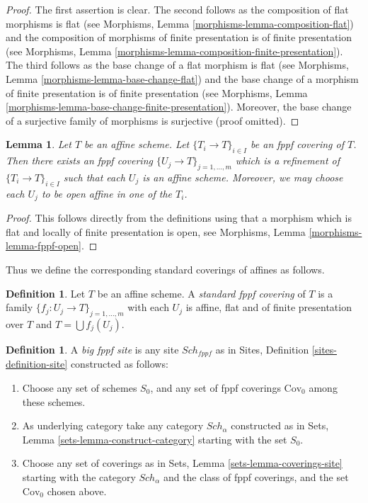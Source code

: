 \documentclass{stacks-project}
\theoremstyle{plain}
\newtheorem{lemma}[subsection]{Lemma}
\theoremstyle{definition}
\newtheorem{definition}[subsection]{Definition}
\theoremstyle{remark}
\numberwithin{equation}{subsection}
\def\Sch{\mathit{Sch}}
\begin{document}
\begin{proof}
The first assertion is clear.
The second follows as the composition of flat morphisms is flat
(see Morphisms, Lemma \ref{morphisms-lemma-composition-flat})
and the composition of morphisms of finite presentation is
of finite presentation
(see Morphisms, Lemma \ref{morphisms-lemma-composition-finite-presentation}).
The third follows as the base change of a flat morphism is flat
(see Morphisms, Lemma \ref{morphisms-lemma-base-change-flat})
and the base change of a morphism of finite presentation is
of finite presentation
(see Morphisms, Lemma \ref{morphisms-lemma-base-change-finite-presentation}).
Moreover, the base change of a surjective family of morphisms is surjective
(proof omitted).
\end{proof}

\begin{lemma}
\label{lemma-fppf-affine}
Let $T$ be an affine scheme.
Let $\{T_i \to T\}_{i \in I}$ be an fppf covering of $T$.
Then there exists an fppf covering
$\{U_j \to T\}_{j = 1, \ldots, m}$ which is a refinement
of $\{T_i \to T\}_{i \in I}$ such that each $U_j$ is an affine
scheme. Moreover, we may choose each $U_j$ to be open affine
in one of the $T_i$.
\end{lemma}

\begin{proof}
This follows directly from the definitions using that a
morphism which is flat and locally of finite presentation is open,
see Morphisms, Lemma \ref{morphisms-lemma-fppf-open}.
\end{proof}

\noindent
Thus we define the corresponding standard coverings of affines as follows.

\begin{definition}
\label{definition-standard-fppf}
Let $T$ be an affine scheme. A {\it standard fppf covering}
of $T$ is a family $\{f_j : U_j \to T\}_{j = 1, \ldots, m}$
with each $U_j$ is affine, flat and of finite presentation over $T$
and $T = \bigcup f_j(U_j)$.
\end{definition}

\begin{definition}
\label{definition-big-fppf-site}
A {\it big fppf site} is any site $\Sch_{fppf}$ as in
Sites, Definition \ref{sites-definition-site} constructed as follows:
\begin{enumerate}
\item Choose any set of schemes $S_0$, and any set of fppf coverings
$\text{Cov}_0$ among these schemes.
\item As underlying category take any category $\Sch_\alpha$
constructed as in Sets, Lemma \ref{sets-lemma-construct-category}
starting with the set $S_0$.
\item Choose any set of coverings as in
Sets, Lemma \ref{sets-lemma-coverings-site} starting with the
category $\Sch_\alpha$ and the class of fppf coverings,
and the set $\text{Cov}_0$ chosen above.
\end{enumerate}
\end{definition}
\end{document}
